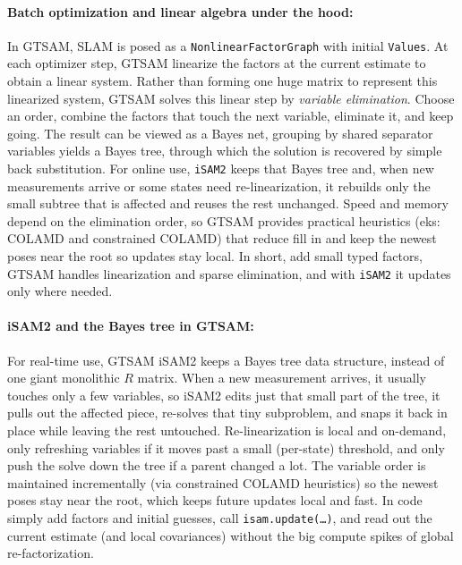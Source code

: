 \paragraph{Batch optimization and linear algebra under the hood:}
In GTSAM, SLAM is posed as a \texttt{NonlinearFactorGraph} with initial \texttt{Values}. At each optimizer step, GTSAM linearize the factors at the current estimate to obtain a linear system. Rather than forming one huge matrix to represent this linearized system, GTSAM solves this linear step by \emph{variable elimination}. Choose an order, combine the factors that touch the next variable, eliminate it, and keep going. The result can be viewed as a Bayes net, grouping by shared separator variables yields a Bayes tree, through which the solution is recovered by simple back substitution. For online use, \texttt{iSAM2} keeps that Bayes tree and, when new measurements arrive or some states need re-linearization, it rebuilds only the small subtree that is affected and reuses the rest unchanged. Speed and memory depend on the elimination order, so GTSAM provides practical heuristics (eks: COLAMD and constrained COLAMD) that reduce fill in and keep the newest poses near the root so updates stay local. In short, add small typed factors, GTSAM handles linearization and sparse elimination, and with \texttt{iSAM2} it updates only where needed. \cite{GTSAM_handbook}

\paragraph{iSAM2 and the Bayes tree in GTSAM:}
For real-time use, GTSAM iSAM2 keeps a Bayes tree data structure, instead of one giant monolithic $R$ matrix. When a new measurement arrives, it usually touches only a few variables, so iSAM2 edits just that small part of the tree, it pulls out the affected piece, re-solves that tiny subproblem, and snaps it back in place while leaving the rest untouched. Re-linearization is local and on-demand, only refreshing variables if it moves past a small (per-state) threshold, and only push the solve down the tree if a parent changed a lot. The variable order is maintained incrementally (via constrained COLAMD heuristics) so the newest poses stay near the root, which keeps future updates local and fast. In code simply add factors and initial guesses, call \texttt{isam.update(\dots)}, and read out the current estimate (and local covariances) without the big compute spikes of global re-factorization. \cite{GTSAM_handbook}

